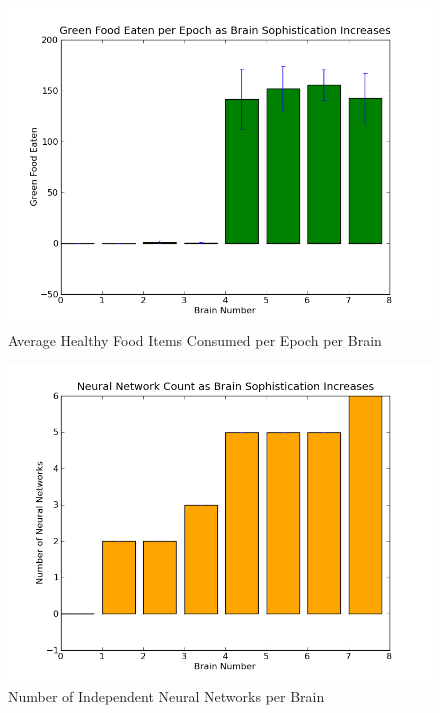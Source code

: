 \documentclass[a4paper,11pt]{article}
\begin{document}
\begin{figure}
\begin{center}
  \includegraphics[scale=1.0]{img/greenBar-0.0-0.0-1.32-0.69-29.79-21.82-15.12-24.72.png}
  \caption{Average Healthy Food Items Consumed per Epoch per Brain  }
  \label{fig:greenbar}
\end{center}
\end{figure}

\begin{figure}
\begin{center}
  \includegraphics[scale=1.0]{img/networkBar-0.0-0.0-0.0-0.0-0.0-0.0-0.0-0.0.png}
  \caption{Number of Independent Neural Networks per Brain }
  \label{fig:networkbar}
\end{center}
\end{figure}
\end{document}
